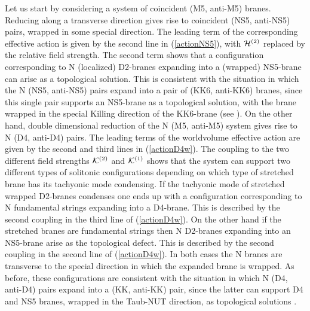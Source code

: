 \documentclass[12pt,a4paper]{article}
\begin{document}
Let us start by considering a system of coincident
(M5, anti-M5) branes. Reducing along a transverse direction gives rise
to coincident (NS5, anti-NS5) pairs, wrapped in some special direction.
The leading term of the corresponding effective action is given by
the second line in (\ref{actionNS5}), with ${\cal H}^{(2)}$ replaced 
by the relative field strength. The second term shows
that a configuration corresponding to
N (localized) D2-branes expanding into a (wrapped) NS5-brane can 
arise as a topological solution. This is consistent with
the situation in which the N (NS5, anti-NS5) pairs expand into a
pair of (KK6, anti-KK6) branes, since this single pair supports an
NS5-brane as a topological solution, with the brane wrapped in the
special Killing direction of the KK6-brane (see \cite{HL1}).
On the other hand, double dimensional reduction of the N (M5, anti-M5)
system gives rise to N (D4, anti-D4) pairs. The leading terms of the 
worldvolume effective action are given by the second and third lines
in (\ref{actionD4w}). The coupling to the two different field strengths
${\cal K}^{(2)}$ and ${\cal K}^{(1)}$ shows that the system can
support two different types of solitonic configurations depending on
which type of stretched brane has its tachyonic mode condensing.
If the tachyonic mode
of stretched wrapped D2-branes condenses one ends up with a
configuration corresponding to 
N fundamental strings expanding into
a D4-brane. This is described by the second coupling in the third line of
(\ref{actionD4w}).
On the other hand if the stretched branes are fundamental strings
then N D2-branes expanding into an NS5-brane arise as the topological
defect. This is described by the second coupling in the second line of
(\ref{actionD4w}).
In both
cases the N branes are transverse to the special direction in which
the expanded brane is wrapped. As before, these configurations are
consistent with the situation in which N (D4, anti-D4) pairs
expand into a (KK, anti-KK) pair, since the latter
can support D4 and NS5 branes, wrapped in the Taub-NUT direction,
as topological solutions \cite{HL1}.
\end{document}
